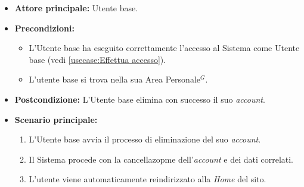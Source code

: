 \label{usecase:Eliminazione account}
\begin{itemize}
	\item \textbf{Attore principale:} Utente base.

	\item \textbf{Precondizioni:}
	      \begin{itemize}
		      \item L'Utente base ha eseguito correttamente l'accesso al Sistema come Utente base (vedi \autoref{usecase:Effettua accesso}).
		      \item L'utente base si trova nella sua Area Personale$^G$.
	      \end{itemize}

	\item \textbf{Postcondizione:} L'Utente base elimina con successo il suo \textit{account}.

	\item \textbf{Scenario principale:}
	      \begin{enumerate}
		      \item L'Utente base avvia il processo di eliminazione del suo \textit{account}.
		      \item Il Sistema procede con la cancellazopme dell'\textit{account} e dei dati correlati.
		      \item L'utente viene automaticamente reindirizzato alla \textit{Home} del sito.
	      \end{enumerate}
\end{itemize}
